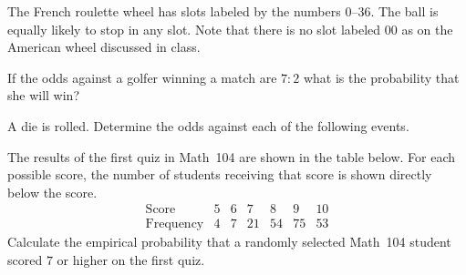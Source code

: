 \documentclass[addpoints,12pt]{exam}
\begin{document}
\begin{questions}

\question[12] The French roulette wheel has
slots labeled by the numbers $0$--$36$. 
The ball is equally likely to stop in any slot.
Note that there is no slot labeled
$00$ as on the American wheel discussed in class.
\newpage

\question[8] If the odds against a golfer winning a match
are $7:2$ what is the probability that she will win?
\vspace{1in}

\question[10] A die is rolled. Determine the odds
against each of the following events.

\question[10] The results of the first quiz in Math~104 are
shown in the table below. For each possible score, the number
of students receiving that score is shown directly below
the score.
\[\begin{array}{c|ccccccc}
\text{Score}&5&6&7&8&9&10\\\hline
\text{Frequency}&4&7&21&54&75&53
\end{array}\]
Calculate the empirical probability that a randomly
selected Math~104 student scored $7$ or higher
on the first quiz.
\vspace{2in}


\end{questions}
\end{document}
